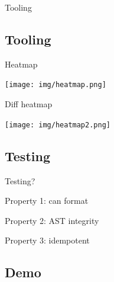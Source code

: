 \documentclass[xcolor=dvipsnames]{beamer}
\theoremstyle{definition}
\begin{document}
\begin{frame}{}
  \begin{center}
    \Huge Tooling
  \end{center}
\end{frame}

\subsection{Tooling} %
\begin{frame}{Heatmap}
  \begin{center}
    \texttt{[image: img/heatmap.png]}
  \end{center}
\end{frame}

\begin{frame}{Diff heatmap}
  \begin{center}
    \texttt{[image: img/heatmap2.png]}
  \end{center}
\end{frame}

\subsection{Testing}

\begin{frame}{}
  \begin{center}
    \Huge Testing?
  \end{center}
\end{frame}

\begin{frame}{Property 1: can format}
  
\end{frame}

\begin{frame}{Property 2: AST integrity}
  
\end{frame}

\begin{frame}{Property 3: idempotent}
  
\end{frame}


\subsection{Demo}
\end{document}
